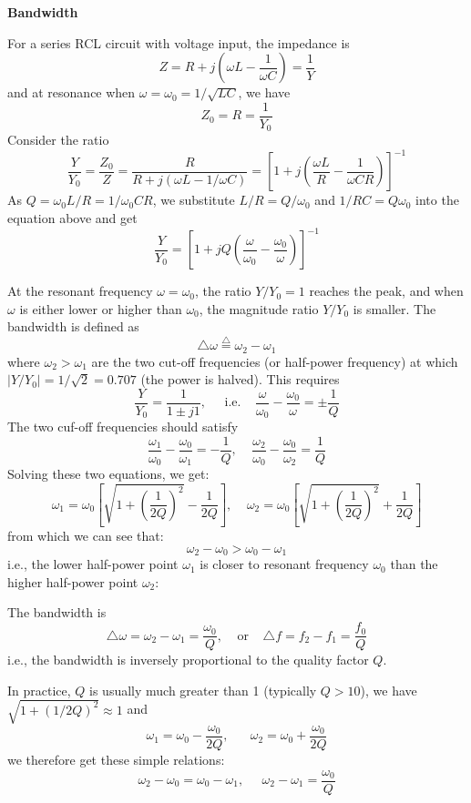 {\bf Bandwidth}

For a series RCL circuit with voltage input, the impedance is
\[	Z=R+j(\omega L-\frac{1}{\omega C})=\frac{1}{Y} \]
and at resonance when $\omega=\omega_0=1/\sqrt{LC}$, we have
\[	Z_0=R=\frac{1}{Y_0}	\]
Consider the ratio 
\[	\frac{Y}{Y_0}=\frac{Z_0}{Z}=\frac{R}{R+j(\omega L-1/\omega C)}
	=[1+j(\frac{\omega L}{R}-\frac{1}{\omega CR})]^{-1}	\]
As $Q=\omega_0L/R=1/\omega_0CR$, we substitute $L/R=Q/\omega_0$ and
$1/RC=Q\omega_0$ into the equation above and get
\[
\frac{Y}{Y_0}=[1+jQ(\frac{\omega}{\omega_0}-\frac{\omega_0}{\omega})]^{-1}
\]



At the resonant frequency $\omega=\omega_0$, the ratio $Y/Y_0=1$
reaches the peak, and when $\omega$ is either lower or higher than 
$\omega_0$, the magnitude ratio $Y/Y_0$ is smaller. The bandwidth 
is defined as 
\[ \triangle \omega\stackrel{\triangle}{=}\omega_2-\omega_1 \]
where $\omega_2>\omega_1$ are the two cut-off frequencies (or 
half-power frequency) at which $|Y/Y_0|=1/\sqrt{2}=0.707$ (the
power is halved). This requires
\[	\frac{Y}{Y_0}=\frac{1}{1\pm j1},\;\;\;\;\;\mbox{i.e.}\;\;\;\;
\frac{\omega}{\omega_0}-\frac{\omega_0}{\omega}=\pm \frac{1}{Q} \]
The two cuf-off frequencies should satisfy
\[ \frac{\omega_1}{\omega_0}-\frac{\omega_0}{\omega_1}=-\frac{1}{Q},\;\;\;\;
   \frac{\omega_2}{\omega_0}-\frac{\omega_0}{\omega_2}=\frac{1}{Q}	\]
Solving these two equations, we get:
\[ \omega_1=\omega_0[\sqrt{1+(\frac{1}{2Q})^2}-\frac{1}{2Q}],\;\;\;\;
   \omega_2=\omega_0[\sqrt{1+(\frac{1}{2Q})^2}+\frac{1}{2Q}]	\]
from which we can see that:
\[	\omega_2-\omega_0 > \omega_0-\omega_1	\]
i.e., the lower half-power point $\omega_1$ is closer to resonant frequency
$\omega_0$ than the higher half-power point $\omega_2$:

The bandwidth is 
\[ \triangle \omega=\omega_2-\omega_1=\frac{\omega_0}{Q},
\;\;\;\;\mbox{or}\;\;\;\;\triangle f=f_2-f_1=\frac{f_0}{Q}	\]
i.e., the bandwidth is inversely proportional to the quality factor $Q$.


In practice, $Q$ is usually much greater than 1 (typically $Q>10$), we have
$\sqrt{1+(1/2Q)^2} \approx 1$ and
\[	\omega_1=\omega_0-\frac{\omega_0}{2Q},\;\;\;\;\;\;
	\omega_2=\omega_0+\frac{\omega_0}{2Q}			\]
we therefore get these simple relations:
\[	\omega_2-\omega_0 = \omega_0-\omega_1,\;\;\;\;\;
	\omega_2-\omega_1=\frac{\omega_0}{Q}	\]


